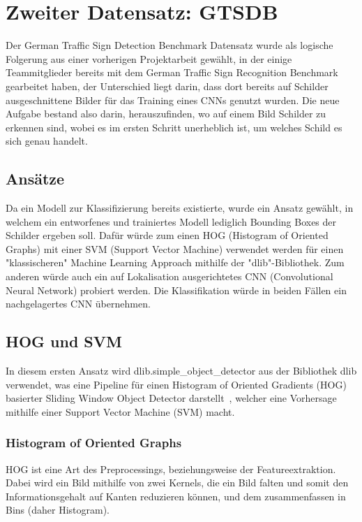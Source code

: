 \documentclass[runningheads]{llncs}
\begin{document}
\section{Zweiter Datensatz: GTSDB}
Der German Traffic Sign Detection Benchmark Datensatz wurde als logische Folgerung aus einer vorherigen Projektarbeit gewählt, in der einige Teammitglieder bereits mit dem German Traffic Sign Recognition Benchmark gearbeitet haben, der Unterschied liegt darin, dass dort bereits auf Schilder ausgeschnittene Bilder für das Training eines CNNs genutzt wurden. Die neue Aufgabe bestand also darin, herauszufinden, wo auf einem Bild Schilder zu erkennen sind, wobei es im ersten Schritt unerheblich ist, um welches Schild es sich genau handelt.

\subsection{Ansätze}
Da ein Modell zur Klassifizierung bereits existierte, wurde ein Ansatz gewählt, in welchem ein entworfenes und trainiertes Modell lediglich Bounding Boxes der Schilder ergeben soll. Dafür würde zum einen HOG (Histogram of Oriented Graphs) mit einer SVM (Support Vector Machine) verwendet werden für einen "klassischeren" Machine Learning Approach mithilfe der "dlib"-Bibliothek. Zum anderen würde auch ein auf Lokalisation ausgerichtetes CNN (Convolutional Neural Network) probiert werden. Die Klassifikation würde in beiden Fällen ein nachgelagertes CNN übernehmen.

\subsection{HOG und SVM}\label{hog_svm}
In diesem ersten Ansatz wird dlib.simple\_object\_detector aus der Bibliothek dlib verwendet, was eine Pipeline für einen Histogram of Oriented Gradients (HOG) basierter Sliding Window Object Detector darstellt~\cite{ref_dlib_docs}, welcher eine Vorhersage mithilfe einer Support Vector Machine (SVM) macht.

\subsubsection{Histogram of Oriented Graphs}
HOG ist eine Art des Preprocessings, beziehungsweise der Featureextraktion. Dabei wird ein Bild mithilfe von zwei Kernels, die ein Bild falten und somit den Informationsgehalt auf Kanten reduzieren können, und dem zusammenfassen in Bins (daher Histogram).
\end{document}

